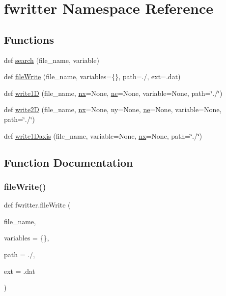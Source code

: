 \hypertarget{namespacefwritter}{}\section{fwritter Namespace Reference}
\label{namespacefwritter}
\subsection*{Functions}
\begin{DoxyCompactItemize}
\item 
def \hyperlink{namespacefwritter_a7af214088321c3e10e574e540d09f177}{search} (file\+\_\+name, variable)
\item 
def \hyperlink{namespacefwritter_a560c4f7444c810caba24c180e30d8ec4}{file\+Write} (file\+\_\+name, variables=\{\}, path=\textquotesingle{}./\textquotesingle{}, ext=\textquotesingle{}.dat\textquotesingle{})
\item 
def \hyperlink{namespacefwritter_aeea41eb9752e0ba83695008dd14c26a9}{write1D} (file\+\_\+name, \hyperlink{cr__source_8h_a02d47a4f36ec0bcce348696534567e30}{nx}=None, \hyperlink{cr__source_8h_a3bf1137663f19e5c361c845cf4dfb7db}{ne}=None, variable=None, path=\char`\"{}./\char`\"{})
\item 
def \hyperlink{namespacefwritter_af0d9ed19402ac07666b4a32c8e503b0f}{write2D} (file\+\_\+name, \hyperlink{cr__source_8h_a02d47a4f36ec0bcce348696534567e30}{nx}=None, ny=None, \hyperlink{cr__source_8h_a3bf1137663f19e5c361c845cf4dfb7db}{ne}=None, variable=None, path=\char`\"{}./\char`\"{})
\item 
def \hyperlink{namespacefwritter_a2572282bba36704cc2f52aab12d97caa}{write1\+Daxis} (file\+\_\+name, variable=None, \hyperlink{cr__source_8h_a02d47a4f36ec0bcce348696534567e30}{nx}=None, path=\char`\"{}./\char`\"{})
\end{DoxyCompactItemize}


\subsection{Function Documentation}
\mbox{\label{namespacefwritter_a560c4f7444c810caba24c180e30d8ec4}} 
\subsubsection{\texorpdfstring{file\+Write()}{fileWrite()}}
{\footnotesize\ttfamily def fwritter.\+file\+Write (\begin{DoxyParamCaption}\item[{}]{file\+\_\+name,  }\item[{}]{variables = {\ttfamily \{\}},  }\item[{}]{path = {\ttfamily \textquotesingle{}./\textquotesingle{}},  }\item[{}]{ext = {\ttfamily \textquotesingle{}.dat\textquotesingle{}} }\end{DoxyParamCaption})}

